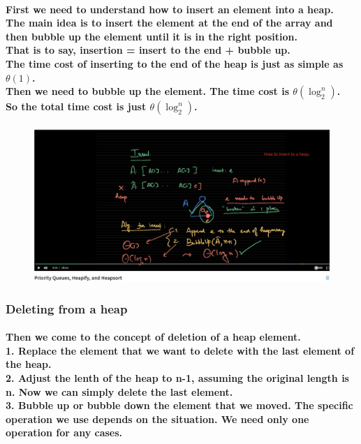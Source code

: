 \documentclass{article}
\begin{document}
\paragraph{First we need to understand how to insert an element into a heap.\\
The main idea is to insert the element at the end of the array and then bubble up the element until it is in the right position.\\
That is to say, insertion = insert to the end + bubble up.\\
The time cost of inserting to the end of the heap is just as simple as $\theta(1)$.\\
Then we need to bubble up the element. The time cost is $\theta(\log_2^n)$.\\
So the total time cost is just $\theta(\log_2^n)$.\\}

\begin{figure}[h]
    \includegraphics[width=\textwidth]{inserttoaheap}
\end{figure}


\subsubsection{Deleting from a heap}

\paragraph{Then we come to the concept of deletion of a heap element.\\
1. Replace the element that we want to delete with the last element of the heap.\\
2. Adjust the lenth of the heap to n-1, assuming the original length is n. Now we can simply delete the last element.\\
3. Bubble up or bubble down the element that we moved. The specific operation we use depends on the situation. We need only one operation for any cases.\\}
\end{document}
